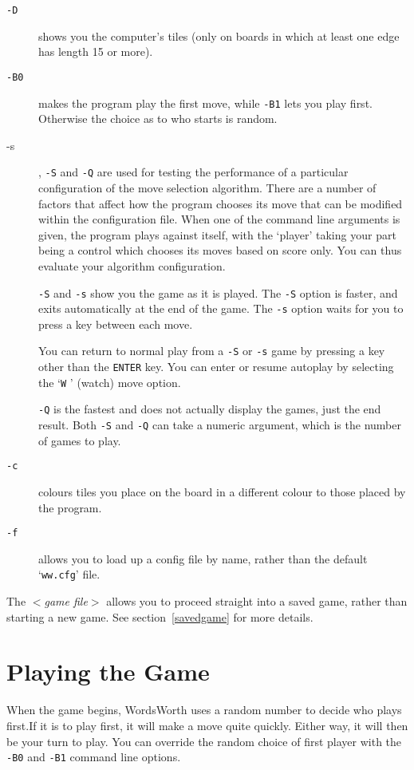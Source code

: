 \begin{description}
\item [{\tt -D}] shows you the computer's tiles (only on boards in which at least
one edge has length 15 or more).
\item [{\tt -B0}] makes the program play the first move, while {\tt -B1}
lets you play first. Otherwise the choice as to who starts is random.
\item [{-s}], {\tt -S} and {\tt -Q} are used for testing the performance 
of a particular configuration of the move selection algorithm. There are a
number of factors that affect how the program chooses its
move that can be modified within the configuration file. When
one of the command line arguments is given, the program plays
against itself, with the `player' taking your part being a
control which chooses its moves based on score only.
You can thus evaluate your algorithm configuration.

{\tt -S} and {\tt -s} show you the game as it is played. The {\tt -S} option
is faster, and exits automatically at the end of the game.
The {\tt -s} option waits for you to press a key between each move.

You can return to normal play from a {\tt -S} or {\tt -s} game by pressing
a key other than the {\tt ENTER} key. You can enter or resume autoplay
by selecting the `{\tt W} ' (watch) move option.

{\tt -Q} is the fastest and does not actually display the games,
just the end result. Both {\tt -S} and {\tt -Q} can take a numeric argument,
which is the number of games to play.
\item [{\tt -c}] colours tiles you place on the board in a different colour to
those placed by the program.
\item [{\tt -f}] allows you to load up a config file by name, rather than the default
`{\tt ww.cfg}' file.
\end{description}

The $<${\em game file}$>$ allows you to proceed straight into a saved game,
rather than starting a new game. See section~\ref{savedgame} for more details.


\section{Playing the Game}

When the game begins, WordsWorth uses a random number to decide who
plays first.If it is to play first, it will make a move quite quickly.
Either way, it will then be your turn to play. You can override the 
random choice of first player with the {\tt -B0} and {\tt -B1} command line options.

